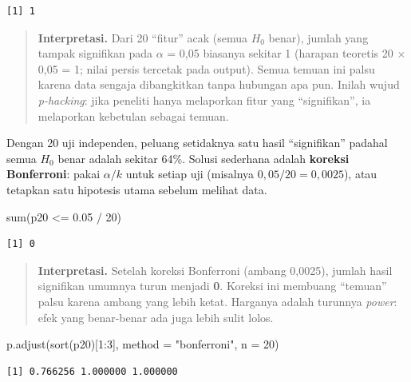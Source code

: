\documentclass[
  indonesian,
  letterpaper,
]{book}
\newenvironment{Shaded}{\begin{snugshade}}{\end{snugshade}}
\newcommand{\AttributeTok}[1]{\textcolor[rgb]{0.40,0.45,0.13}{#1}}
\newcommand{\DecValTok}[1]{\textcolor[rgb]{0.68,0.00,0.00}{#1}}
\newcommand{\FloatTok}[1]{\textcolor[rgb]{0.68,0.00,0.00}{#1}}
\newcommand{\FunctionTok}[1]{\textcolor[rgb]{0.28,0.35,0.67}{#1}}
\newcommand{\NormalTok}[1]{\textcolor[rgb]{0.00,0.23,0.31}{#1}}
\newcommand{\SpecialCharTok}[1]{\textcolor[rgb]{0.37,0.37,0.37}{#1}}
\newcommand{\StringTok}[1]{\textcolor[rgb]{0.13,0.47,0.30}{#1}}
\begin{document}
\begin{verbatim}
[1] 1
\end{verbatim}

\begin{quote}
\textbf{Interpretasi.} Dari 20 ``fitur'' acak (semua \(H_0\) benar),
jumlah yang tampak signifikan pada \(\alpha\) = 0,05 biasanya sekitar 1
(harapan teoretis 20 × 0,05 = 1; nilai persis tercetak pada output).
Semua temuan ini palsu karena data sengaja dibangkitkan tanpa hubungan
apa pun. Inilah wujud \emph{p-hacking}: jika peneliti hanya melaporkan
fitur yang ``signifikan'', ia melaporkan kebetulan sebagai temuan.
\end{quote}

Dengan 20 uji independen, peluang setidaknya satu hasil ``signifikan''
padahal semua \(H_0\) benar adalah sekitar 64\%. Solusi sederhana adalah
\textbf{koreksi Bonferroni}: pakai \(\alpha/k\) untuk setiap uji
(misalnya \(0{,}05/20 = 0{,}0025\)), atau tetapkan satu hipotesis utama
sebelum melihat data.

\begin{Shaded}
\begin{Highlighting}[]
\FunctionTok{sum}\NormalTok{(p20 }\SpecialCharTok{\textless{}=} \FloatTok{0.05} \SpecialCharTok{/} \DecValTok{20}\NormalTok{)}
\end{Highlighting}
\end{Shaded}

\begin{verbatim}
[1] 0
\end{verbatim}

\begin{quote}
\textbf{Interpretasi.} Setelah koreksi Bonferroni (ambang 0,0025),
jumlah hasil signifikan umumnya turun menjadi \textbf{0}. Koreksi ini
membuang ``temuan'' palsu karena ambang yang lebih ketat. Harganya
adalah turunnya \emph{power}: efek yang benar-benar ada juga lebih sulit
lolos.
\end{quote}

\begin{Shaded}
\begin{Highlighting}[]
\FunctionTok{p.adjust}\NormalTok{(}\FunctionTok{sort}\NormalTok{(p20)[}\DecValTok{1}\SpecialCharTok{:}\DecValTok{3}\NormalTok{], }\AttributeTok{method =} \StringTok{"bonferroni"}\NormalTok{, }\AttributeTok{n =} \DecValTok{20}\NormalTok{)}
\end{Highlighting}
\end{Shaded}

\begin{verbatim}
[1] 0.766256 1.000000 1.000000
\end{verbatim}
\end{document}
